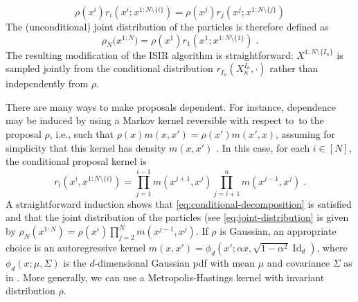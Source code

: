 \documentclass{article}
\def\Id{\operatorname{Id}}
\def\eqsp{\,}
\def\wrt{w.r.t.}
\def\eqsp{\;}
\newcommand{\1}{\mathds{1}}
\def\Id{\operatorname{Id}}
\def\Id{\operatorname{Id}}
\def\proposal{\rho}
\newcommand{\chunku}[3]{#1^{#2:#3}}
\newcommand{\chunkum}[4]{#1^{#2:#3 \setminus \{#4\}}}
\def\wrt{with respect to}
\begin{document}
\begin{equation}
\label{eq:conditional-decomposition}
\proposal(x^i) r_i(x^i;\chunkum{x}{1}{N}{i})=
\proposal(x^j) r_j(x^{j};\chunkum{x}{1}{N}{j})
\end{equation}
The (unconditional) joint distribution of the particles is therefore defined as
\begin{equation}
\label{eq:joint-distribution}
\proposal_N\bigl(\chunku{x}{1}{N}\bigr) = \proposal(x^1) r_1(x^1;\chunkum{x}{1}{N}{1}) \eqsp.
\end{equation}
The resulting modification of the ISIR algorithm is straightforward: $\chunkum{X}{1}{N}{I_n}$ is sampled jointly from the conditional distribution $r_{I_n}(X_n^{I_n},\cdot)$ rather than independently from $\proposal$.

There are many ways to make proposals dependent. For instance, dependence may be induced by using a Markov kernel reversible \wrt\ to the proposal $\proposal$, i.e., such that $\proposal(x) m(x,x')= \proposal(x') m(x',x)$, assuming for simplicity that this kernel has density $m(x,x')$ \cite{ruiz:titsias:doucet:2020}. In this case, for each $i \in [N]$, the conditional proposal kernel is
\begin{equation}
\label{eq:condition-kernel}
r_i(x^i,\chunkum{x}{1}{N}{i})  =\prod_{j=1}^{i-1} m(x^{j+1},x^{j}) \prod_{j=i+1}^n m(x^{j-1},x^j) \eqsp.
\end{equation}
A straightforward induction shows that \eqref{eq:conditional-decomposition} is satisfied and that the joint distribution of the particles (see \eqref{eq:joint-distribution} is given by  $\proposal_N(\chunku{x}{1}{N})=\proposal(x^i) \prod_{j=2}^{N} m(x^{j-1},x^j)$. If $\proposal$ is Gaussian, an appropriate choice is an autoregressive kernel $m(x,x')= \phi_d(x';\alpha x, \sqrt{1-\alpha^2} \Id_d)$, where $\phi_d(x; \mu, \Sigma)$ is the $d$-dimensional Gaussian pdf with mean $\mu$ and covariance $\Sigma$ as in  \cite{ruiz:titsias:doucet:2020}. More generally, we can use a Metropolis-Hastings kernel with invariant distribution $\proposal$.
\end{document}
